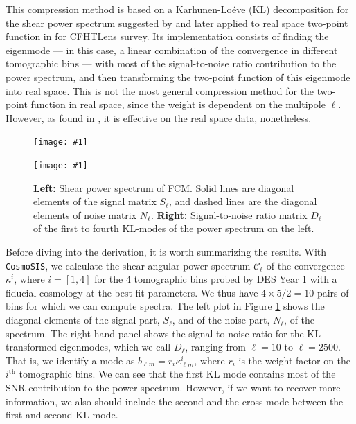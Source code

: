 \documentclass[twocolumn,nofootinbib]{\docclass}
\newcommand{\sfig}[2]{
	\texttt{[image: \#1]}
}
\newcommand{\rf}[1]{Figure \ref{fig:#1}}
\newcommand\full{FCM}
\newcommand\ctot{\mathcal{C}}
\begin{document}
	This compression method is based on a Karhunen-Lo\'eve (KL) decomposition for the shear power spectrum suggested by \citep{Alonso:2017hhj} and later applied to real space two-point function in \citep{Bellini:2019ssw} for CFHTLens survey. Its implementation consists of finding the eigenmode --- in this case, a linear combination of the convergence in different tomographic bins --- with most of the signal-to-noise ratio contribution to the power spectrum, and then transforming the two-point function of this eigenmode into real space. This is not the most general compression method for the two-point function in real space, since the weight is dependent on the multipole $\ell$. However, as found in \citep{Bellini:2019ssw}, it is effective on the real space data, nonetheless.
	
	\begin{figure}[thbp]
	    \sfig{figures/Cl_newrange.png}{0.8\columnwidth}
		\qquad \qquad \qquad
	    \sfig{figures/Dl_newrange.png}{0.8\columnwidth}
		\caption{\textbf{Left:} Shear power spectrum of \full. Solid lines are diagonal elements of the signal matrix $S_{\ell}$, and dashed lines are the diagonal elements of noise matrix $N_{\ell}$.
		\textbf{Right:} Signal-to-noise ratio matrix $D_\ell$ of the first to fourth KL-modes of the power spectrum on the left.  \label{fig:ClDl}}
	\end{figure}
	
	Before diving into the derivation, it is worth summarizing the results. With {\tt CosmoSIS}, we calculate the shear angular power spectrum $\ctot_{\ell}$ of the convergence $\kappa^i$, where $i=[1,4]$ for the 4 tomographic bins probed by DES Year 1 with a fiducial cosmology at the best-fit parameters. We thus have $4\times 5/2=10$ pairs of bins for which we can compute spectra. The left plot in \rf{ClDl} shows the diagonal elements of the signal part, $S_\ell$, and of the noise part, $N_\ell$, of the spectrum. 
	The right-hand panel shows the signal to noise ratio for the KL-transformed eigenmodes, which we call $D_{\ell}$, ranging from $\ell = 10$ to $\ell = 2500$. That is, we identify a mode as $b_{\ell m} = r_i \kappa_{\ell m}^i$, where $r_i$ is the weight factor on the $i^{\text{th}}$ tomographic bins. We can see that the first KL mode contains most of the SNR contribution to the power spectrum. However, if we want to recover more information, we also should include the second and the cross mode between the first and second KL-mode.
	
\end{document}
